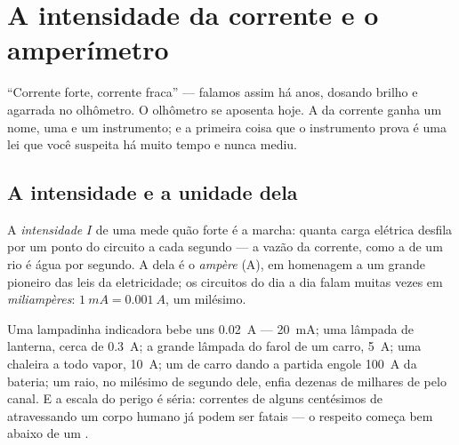 \chapter{A intensidade da corrente e o amperímetro}\label{ch:g8:intensity-ammeter}

``Corrente forte, corrente fraca'' --- falamos assim há anos, dosando
brilho e agarrada no olhômetro. O olhômetro se aposenta hoje. A 
da corrente ganha um nome, uma  e um instrumento; e a primeira
coisa que o instrumento prova é uma lei que você suspeita há muito
tempo e nunca mediu.

\section{A intensidade e a unidade dela}

\begin{definition}[Intensidade]\label{def:g8:intensity-ammeter:intensity}
A \emph{intensidade} $I$ de uma 
mede quão forte é a marcha: quanta carga elétrica desfila por um
ponto do circuito a cada segundo --- a vazão da corrente, como a de
um rio é água por segundo. A  dela é o
\emph{ampère} (\unit{A}), em homenagem a um grande
pioneiro das leis da eletricidade; os circuitos do dia a dia falam
muitas vezes em \emph{miliampères}: $\qty{1}{mA} = \qty{0.001}{A}$,
um milésimo.
\end{definition}

\begin{example}\label{ex:g8:intensity-ammeter:values}
Uma lampadinha indicadora bebe uns \qty{0.02}{A} --- \qty{20}{mA};
uma lâmpada de lanterna, cerca de \qty{0.3}{A}; a grande lâmpada do
farol de um carro, \qty{5}{A}; uma chaleira a todo vapor,
\qty{10}{A}; um  de carro dando a partida engole \qty{100}{A} da
bateria; um raio, no milésimo de segundo dele, enfia dezenas de
milhares de  pelo canal. E a escala do perigo é séria:
correntes de alguns centésimos de  atravessando um corpo humano
já podem ser fatais --- o respeito começa bem abaixo de um .
\end{example}

